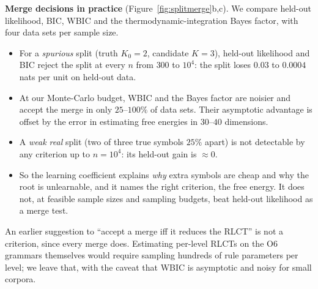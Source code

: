 \documentclass[11pt]{article}
\theoremstyle{definition}
\theoremstyle{remark}
\begin{document}
\textbf{Merge decisions in practice} (Figure~\ref{fig:splitmerge}b,c). We compare held-out likelihood, BIC, WBIC and the thermodynamic-integration Bayes factor, with four data sets per sample size.
\begin{itemize}
  \item For a \emph{spurious} split (truth $K_0=2$, candidate $K=3$), held-out likelihood and BIC reject the split at every $n$ from $300$ to $10^4$: the split loses $0.03$ to $0.0004$ nats per unit on held-out data.
  \item At our Monte-Carlo budget, WBIC and the Bayes factor are noisier and accept the merge in only $25$--$100\%$ of data sets. Their asymptotic advantage is offset by the error in estimating free energies in $30$--$40$ dimensions.
  \item A \emph{weak real} split (two of three true symbols $25\%$ apart) is not detectable by any criterion up to $n=10^4$: its held-out gain is $\approx0$.
  \item So the learning coefficient explains \emph{why} extra symbols are cheap and why the root is unlearnable, and it names the right criterion, the free energy. It does not, at feasible sample sizes and sampling budgets, beat held-out likelihood as a merge test.
\end{itemize}
An earlier suggestion to ``accept a merge iff it reduces the RLCT'' is not a criterion, since every merge does. Estimating per-level RLCTs on the O6 grammars themselves would require sampling hundreds of rule parameters per level; we leave that, with the caveat that WBIC is asymptotic and noisy for small corpora.
\end{document}
